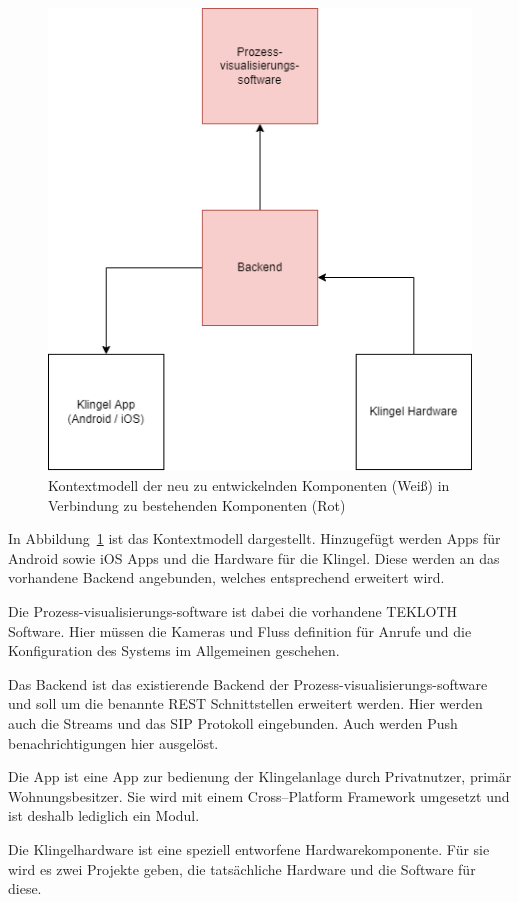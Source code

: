 \begin{figure}[ht!]
    \centering\includegraphics[width=\paperwidth/2]{../assets/img/kontextmodell}

    \caption{Kontextmodell der neu zu entwickelnden Komponenten (Weiß) in Verbindung zu bestehenden Komponenten (Rot)}
    \label{fig:kontextmodell}
\end{figure}
In Abbildung~\ref{fig:kontextmodell} ist das Kontextmodell dargestellt.
Hinzugefügt werden Apps für Android sowie iOS Apps und die Hardware für die Klingel.
Diese werden an das vorhandene Backend angebunden, welches entsprechend erweitert wird.


Die Prozess-visualisierungs-software ist dabei die vorhandene TEKLOTH Software.
Hier müssen die Kameras und Fluss definition für Anrufe und die Konfiguration des Systems im Allgemeinen geschehen.


Das Backend ist das existierende Backend der Prozess-visualisierungs-software und soll um die benannte REST Schnittstellen erweitert werden.
Hier werden auch die Streams und das SIP Protokoll eingebunden.
Auch werden Push benachrichtigungen hier ausgelöst.


Die App ist eine App zur bedienung der Klingelanlage durch Privatnutzer, primär Wohnungsbesitzer.
Sie wird mit einem Cross--Platform Framework umgesetzt und ist deshalb lediglich ein Modul.


Die Klingelhardware ist eine speziell entworfene Hardwarekomponente.
Für sie wird es zwei Projekte geben, die tatsächliche Hardware und die Software für diese.

